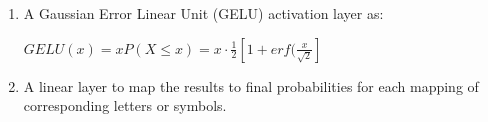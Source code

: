 \begin{enumerate}[start=1,label={\bfseries \arabic*:}]
    \item A Gaussian Error Linear Unit (GELU) activation layer as: 
        \vspace{5pt}

    \begin{center}
    $GELU(x) = xP(X \leq x) = x \cdot \frac{1}{2} [1 + erf(\frac{x}{\sqrt{2}}]$
    \end{center}
        \vspace{5pt}

    \item A linear layer to map the results to final probabilities for each mapping of corresponding letters or symbols. 
    
\end{enumerate}

